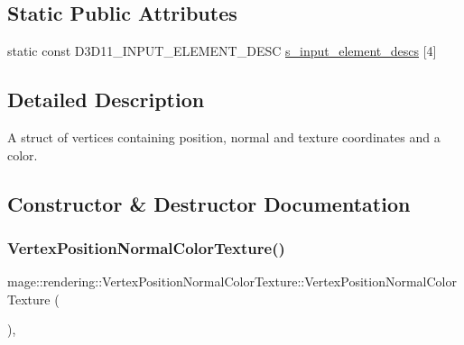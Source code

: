 \subsection*{Static Public Attributes}
\begin{DoxyCompactItemize}
\item 
static const D3\+D11\+\_\+\+I\+N\+P\+U\+T\+\_\+\+E\+L\+E\+M\+E\+N\+T\+\_\+\+D\+E\+SC \mbox{\hyperlink{structmage_1_1rendering_1_1_vertex_position_normal_color_texture_a7776f639d08c1612e9faa5a328e1ea7b}{s\+\_\+input\+\_\+element\+\_\+descs}} \mbox{[}4\mbox{]}
\end{DoxyCompactItemize}


\subsection{Detailed Description}
A struct of vertices containing position, normal and texture coordinates and a color. 

\subsection{Constructor \& Destructor Documentation}
\mbox{\label{structmage_1_1rendering_1_1_vertex_position_normal_color_texture_a9655643724642a5d4a3f5baf85340412}} 
\subsubsection{\texorpdfstring{Vertex\+Position\+Normal\+Color\+Texture()}{VertexPositionNormalColorTexture()}\hspace{0.1cm}{\footnotesize\ttfamily [1/4]}}
{\footnotesize\ttfamily mage\+::rendering\+::\+Vertex\+Position\+Normal\+Color\+Texture\+::\+Vertex\+Position\+Normal\+Color\+Texture (\begin{DoxyParamCaption}{ }\end{DoxyParamCaption})\hspace{0.3cm}{\ttfamily [default]}, {\ttfamily [noexcept]}}

